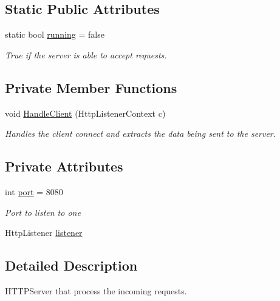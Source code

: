 \subsection*{Static Public Attributes}
\begin{DoxyCompactItemize}
\item 
static bool \hyperlink{class_web_server_1_1_server_aea270e1d81ce0cd9fab583d7c5b3d607}{running} = false
\begin{DoxyCompactList}\small\item\em True if the server is able to accept requests. \end{DoxyCompactList}\end{DoxyCompactItemize}
\subsection*{Private Member Functions}
\begin{DoxyCompactItemize}
\item 
void \hyperlink{class_web_server_1_1_server_afe0e981788cf1391f02bbbc416b8bd0c}{Handle\+Client} (Http\+Listener\+Context c)
\begin{DoxyCompactList}\small\item\em Handles the client connect and extracts the data being sent to the server. \end{DoxyCompactList}\end{DoxyCompactItemize}
\subsection*{Private Attributes}
\begin{DoxyCompactItemize}
\item 
int \hyperlink{class_web_server_1_1_server_a36d33c2119e76991cc667cef94f3a051}{port} = 8080
\begin{DoxyCompactList}\small\item\em Port to listen to one \end{DoxyCompactList}\item 
Http\+Listener \hyperlink{class_web_server_1_1_server_a5ab44ecc1b382c640c3a351c135e9c71}{listener}
\end{DoxyCompactItemize}


\subsection{Detailed Description}
H\+T\+T\+P\+Server that process the incoming requests. 



